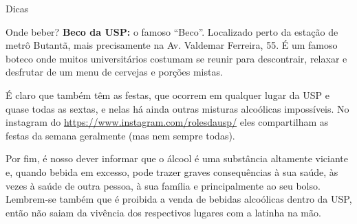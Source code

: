 \begin{secao}{Dicas}
\begin{subsecao}{Onde beber?}
{\bf Beco da USP:} o famoso ``Beco''. Localizado perto da estação de metrô
Butantã, mais precisamente na Av. Valdemar Ferreira, 55. É um famoso boteco onde
muitos universitários costumam se reunir para descontrair, relaxar e desfrutar de
um menu de cervejas e porções mistas.

É claro que também têm as festas, que ocorrem em qualquer lugar da USP e quase
todas as sextas, e nelas há ainda outras misturas alcoólicas impossíveis. 
No instagram do \url{https://www.instagram.com/rolesdausp/} eles compartilham as 
festas da semana geralmente (mas nem sempre todas).

Por fim, é nosso dever informar que o álcool é uma substância altamente viciante
e, quando bebida em excesso, pode trazer graves consequências à sua saúde, às
vezes à saúde de outra pessoa, à sua família e principalmente ao seu bolso.
Lembrem-se também que é proibida a venda de bebidas alcoólicas dentro da USP,
então não saiam da vivência dos respectivos lugares com a latinha na mão.

\end{subsecao}
\end{secao}
